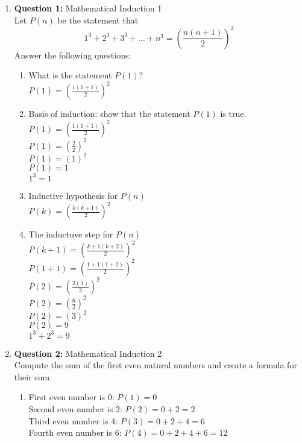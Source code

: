 \documentclass[11pt]{article}
\begin{document}
\begin{enumerate}
\item
\textbf{Question 1:} Mathematical Induction 1 \\
Let $P(n)$ be the statement that
\begin{equation*}
1^3 + 2^3 + 3^3 + \dots + n^3 = \left( \frac{n(n+1)}{2} \right)^2
\end{equation*}
Answer the following questions: 
\begin{enumerate}[label=(\alph*)]
    \item
    What is the statement $P(1)$? \\
    $P(1) = \left( \frac{1(1+1)}{2} \right)^2$
    \item 
    Basis of induction: show that the statement $P(1)$ is true. \\
    $P(1) = \left( \frac{1(1+1)}{2} \right)^2$ \\
    $P(1) = \left( \frac{2}{2} \right)^2$ \\
    $P(1) = \left( 1 \right)^2$ \\
    $P(1) = 1$\\
    $1^3 = 1$
    \item
    Inductive hypothesis for $P(n)$ \\
    $P(k) = \left( \frac{k(k+1)}{2} \right)^2$ 
    \item
    The inductuve step for $P(n)$ \\
    $P(k+1) = \left( \frac{k+1(k+2)}{2} \right)^2$ \\
    $P(1+1) = \left( \frac{1+1(1+2)}{2} \right)^2$ \\
    $P(2) = \left( \frac{2(3)}{2} \right)^2$ \\
    $P(2) = \left( \frac{6}{2} \right)^2$ \\
    $P(2) = \left( 3 \right)^2$ \\
    $P(2) = 9$ \\
    $1^3 + 2^3 = 9$
\end{enumerate}
\item
\textbf{Question 2:} Mathematical Induction 2 \\
Compute the sum of the first even natural numbers and create a formula for their sum.
\begin{enumerate}[label=(\alph*)]
    \item
    First even number is 0: $P(1) = 0$ \\
    Second even number is 2: $P(2) = 0 + 2 = 2$\\
    Third even number is 4: $P(3) = 0 + 2 + 4 = 6$\\
    Fourth even number is 6: $P(4) = 0 + 2 + 4 + 6 = 12$\\

\end{enumerate}
\end{enumerate}
\end{document}
